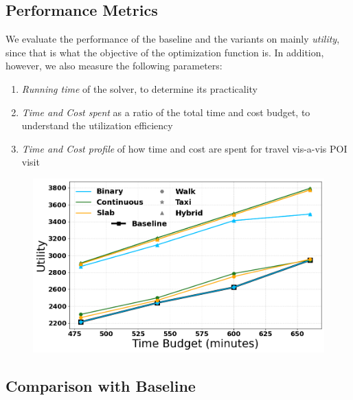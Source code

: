 \subsection{Performance Metrics}

We evaluate the performance of the baseline and the \trip variants on mainly \emph{utility}, since that is what the objective of the optimization function is.
In addition, however, we also measure the following parameters:

\begin{enumerate}
    \item \emph{Running time} of the solver, to determine its practicality
    \item \emph{Time and Cost spent} as a ratio of the total time and cost budget, to understand the utilization efficiency
    \item \emph{Time and Cost profile} of how time and cost are spent for travel vis-a-vis POI visit
\end{enumerate}

\begin{figure}[t]
\centering
\includegraphics[width=\figwidth]{plots/baseline_singleDay.png}
\label{fig:baseline-single}
\end{figure}

\subsection{Comparison with Baseline}

